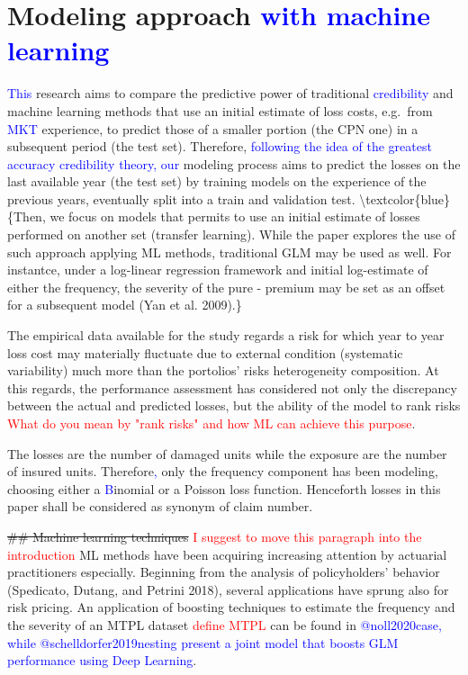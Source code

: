 \documentclass[
]{article}
\begin{document}
\hypertarget{modeling-approach}{%
\section{\texorpdfstring{Modeling approach
\textcolor{blue}{with machine learning}}{Modeling approach }}\label{modeling-approach}}

\textcolor{blue}{This} research aims to compare the predictive power of
traditional \textcolor{blue}{credibility} and machine learning methods
that use an initial estimate of loss costs, e.g.~from
\textcolor{blue}{MKT} experience, to predict those of a smaller portion
(the CPN one) in a subsequent period (the test set). Therefore,
\textcolor{blue}{following the idea of the greatest accuracy credibility theory, our}
modeling process aims to predict the losses on the last available year
(the test set) by training models on the experience of the previous
years, eventually split into a train and validation test.
\textbackslash textcolor\{blue\}\{Then, we focus on models that permits
to use an initial estimate of losses performed on another set (transfer
learning). While the paper explores the use of such approach applying ML
methods, traditional GLM may be used as well. For instantce, under a
log-linear regression framework and initial log-estimate of either the
frequency, the severity of the pure - premium may be set as an offset
for a subsequent model (Yan et al. 2009).\}

The empirical data available for the study regards a risk for which year
to year loss cost may materially fluctuate due to external condition
(systematic variability) much more than the portolios' risks
heterogeneity composition. At this regards, the performance assessment
has considered not only the discrepancy between the actual and predicted
losses, but the ability of the model to rank risks
\textcolor{red}{What do you mean by "rank risks" and how ML can achieve this purpose}.

The losses are the number of damaged units while the exposure are the
number of insured units. Therefore\textcolor{blue}{,} only the frequency
component has been modeling, choosing either a
\textcolor{blue}{B}inomial or a Poisson loss function. Henceforth losses
in this paper shall be considered as synonym of claim number.

\sout{\#\# Machine learning techniques}
\textcolor{red}{I suggest to  move this paragraph into the introduction}
ML methods have been acquiring increasing attention by actuarial
practitioners especially. Beginning from the analysis of policyholders'
behavior (Spedicato, Dutang, and Petrini 2018), several applications
have sprung also for risk pricing. An application of boosting techniques
to estimate the frequency and the severity of an MTPL dataset
\textcolor{red}{define MTPL} can be found in
\textcolor{blue}{@noll2020case, while @schelldorfer2019nesting present a joint model that boosts GLM performance using Deep Learning}.
\end{document}
